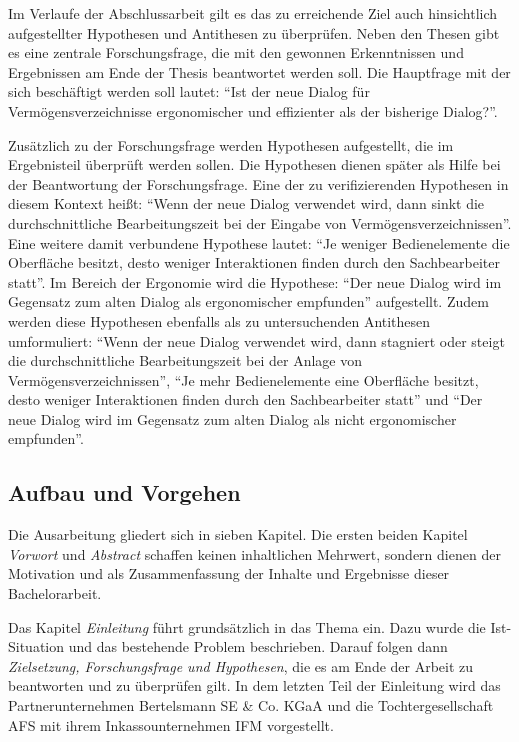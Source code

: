 Im Verlaufe der Abschlussarbeit gilt es das zu erreichende Ziel auch hinsichtlich aufgestellter Hypothesen und Antithesen zu überprüfen. Neben den Thesen gibt es eine zentrale Forschungsfrage, die mit den gewonnen Erkenntnissen und Ergebnissen am Ende der Thesis beantwortet werden soll. Die Hauptfrage mit der sich beschäftigt werden soll lautet: \enquote{Ist der neue Dialog für Vermögensverzeichnisse ergonomischer und effizienter als der bisherige Dialog?}.

Zusätzlich zu der Forschungsfrage werden Hypothesen aufgestellt, die im Ergebnisteil überprüft werden sollen. Die Hypothesen dienen später als Hilfe bei der Beantwortung der Forschungsfrage. Eine der zu verifizierenden Hypothesen in diesem Kontext heißt: \enquote{Wenn der neue Dialog verwendet wird, dann sinkt die durchschnittliche Bearbeitungszeit bei der Eingabe von Vermögensverzeichnissen}. Eine weitere damit verbundene Hypothese lautet: \enquote{Je weniger Bedienelemente die Oberfläche besitzt, desto weniger Interaktionen finden durch den Sachbearbeiter statt}. Im Bereich der Ergonomie wird die Hypothese: \enquote{Der neue Dialog wird im Gegensatz zum alten Dialog als ergonomischer empfunden} aufgestellt. Zudem werden diese Hypothesen ebenfalls als zu untersuchenden Antithesen umformuliert: \enquote{Wenn der neue Dialog verwendet wird, dann stagniert oder steigt die durchschnittliche Bearbeitungszeit bei der Anlage von Vermögensverzeichnissen}, \enquote{Je mehr Bedienelemente eine Oberfläche besitzt, desto weniger Interaktionen finden durch den Sachbearbeiter statt} und \enquote{Der neue Dialog wird im Gegensatz zum alten Dialog als nicht ergonomischer empfunden}.


\subsection{Aufbau und Vorgehen}
Die Ausarbeitung gliedert sich in sieben Kapitel. Die ersten beiden Kapitel \textit{Vorwort} und \textit{Abstract} schaffen keinen inhaltlichen Mehrwert, sondern dienen der Motivation und als Zusammenfassung der Inhalte und Ergebnisse dieser Bachelorarbeit.

Das Kapitel \textit{Einleitung} führt grundsätzlich in das Thema ein. Dazu wurde die Ist-Situation und das bestehende Problem beschrieben. Darauf folgen dann \textit{Zielsetzung, Forschungsfrage und Hypothesen}, die es am Ende der Arbeit zu beantworten und zu überprüfen gilt. In dem letzten Teil der Einleitung wird das Partnerunternehmen Bertelsmann SE \& Co. KGaA und die Tochtergesellschaft \gls{AFS} mit ihrem Inkassounternehmen \gls{IFM} vorgestellt.

